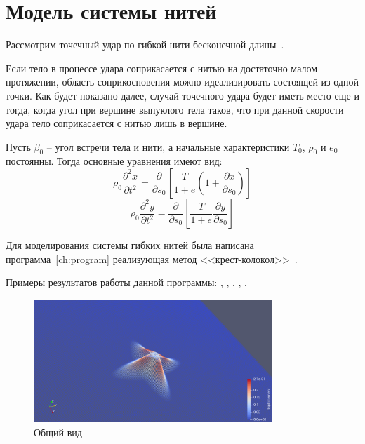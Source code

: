 \section{Модель системы нитей}\label{sec:eq-fibers}
Рассмотрим точечный удар по гибкой нити бесконечной длины~\cite{rakhmatulin}.

Если тело в процессе удара соприкасается с нитью на достаточно малом протяжении, область соприкосновения можно
идеализировать состоящей из одной точки.
Как будет показано далее, случай точечного удара будет иметь место еще и тогда, когда угол при вершине выпуклого
тела таков, что при данной скорости удара тело соприкасается с нитью лишь в вершине.

Пусть $\beta_0$ -- угол встречи тела и нити, а начальные характеристики $T_0$, $\rho_0$ и $e_0$ постоянны.
Тогда основные уравнения имеют вид:
\begin{equation}
    \rho_0 \dfrac{\partial^2 x}{\partial t^2} = \dfrac{\partial}{\partial s_0} \left[ \dfrac{T}{1 + e} \left( 1 + \dfrac{\partial x}{\partial s_0} \right) \right]
\end{equation}
\begin{equation}
    \rho_0 \dfrac{\partial^2 y}{\partial t^2} = \dfrac{\partial}{\partial s_0} \left[ \dfrac{T}{1 + e} \dfrac{\partial y}{\partial s_0} \right]
\end{equation}

Для моделирования системы гибких нитей была написана программа~\ref{ch:program} реализующая метод
<<крест-колокол>>~\cite{rakhmatulin}.

Примеры результатов работы данной программы: ,
, ,
, .

\begin{figure}[H]
    \centering
    \includegraphics[width=0.8\textwidth]{img/fiber/example_overview.png}
    \caption{Общий вид}
    \label{pic:fiber-example-overview}
\end{figure}

